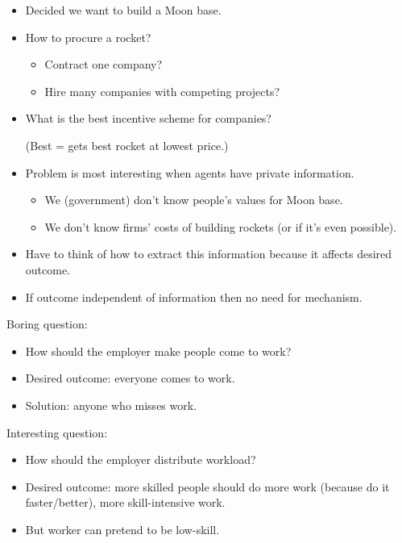 \documentclass[english]{beamer}		%
\def\lyxframeend{} %
\begin{document}
\begin{itemize}
	\item Decided we want to build a Moon base.
	\item How to procure a rocket?
	\begin{itemize}
		\item Contract one company?
		\item Hire many companies with competing projects?
	\end{itemize}
	\item What is the best incentive scheme for companies? 
	
	(Best = gets best rocket at lowest price.)
\end{itemize}
\lyxframeend


\begin{itemize}
	\item Problem is most interesting when agents have private information.
	\begin{itemize}
		\item We (government) don't know people's values for Moon base.
		\item We don't know firms' costs of building rockets (or if it's even possible).
	\end{itemize}
	\pause
	\item Have to think of how to extract this information because it affects desired outcome.
	
	\item If outcome independent of information then no need for mechanism.
\end{itemize}
\lyxframeend


\begin{exampleblock}{Boring question:}
	\begin{itemize}
		\item How should the employer \alert<1>{make people come to work}?
		\item Desired outcome: everyone comes to work.
		\item Solution:  anyone who misses work.
	\end{itemize}
\end{exampleblock}
\pause
\begin{exampleblock}{Interesting question:}
	\begin{itemize}
		\item How should the employer \alert<2>{distribute workload}?
		\item Desired outcome: more skilled people should do more work (because do it faster/better), more skill-intensive work.
		\item But worker can pretend to be low-skill.
	\end{itemize}
\end{exampleblock}
\lyxframeend
\end{document}
